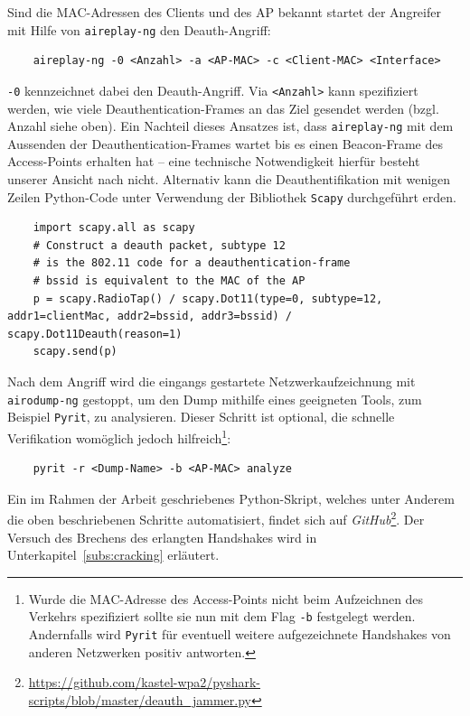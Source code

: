Sind die MAC-Adressen des Clients und des AP bekannt startet der Angreifer mit Hilfe von \texttt{aireplay-ng} den Deauth-Angriff: 
\begin{Verbatim}
	aireplay-ng -0 <Anzahl> -a <AP-MAC> -c <Client-MAC> <Interface>
\end{Verbatim}
\texttt{-0} kennzeichnet dabei den Deauth-Angriff.
Via \texttt{<Anzahl>} kann spezifiziert werden, wie viele Deauthentication-Frames an das Ziel gesendet werden (bzgl. Anzahl siehe oben).
Ein Nachteil dieses Ansatzes ist, dass \texttt{aireplay-ng} mit dem Aussenden der Deauthentication-Frames wartet bis es einen Beacon-Frame des Access-Points erhalten hat -- eine technische Notwendigkeit hierfür besteht unserer Ansicht nach nicht.
Alternativ kann die Deauthentifikation mit wenigen Zeilen Python-Code unter Verwendung der Bibliothek \texttt{Scapy} durchgeführt erden.

\begin{verbatim}
	import scapy.all as scapy
	# Construct a deauth packet, subtype 12 
	# is the 802.11 code for a deauthentication-frame
	# bssid is equivalent to the MAC of the AP
	p = scapy.RadioTap() / scapy.Dot11(type=0, subtype=12, addr1=clientMac, addr2=bssid, addr3=bssid) / scapy.Dot11Deauth(reason=1)
	scapy.send(p)
\end{verbatim}

Nach dem Angriff wird die eingangs gestartete Netzwerkaufzeichnung mit \texttt{airodump-ng} gestoppt, um den Dump mithilfe eines geeigneten Tools, zum Beispiel \texttt{Pyrit}, zu analysieren. Dieser Schritt ist optional, die schnelle Verifikation womöglich jedoch hilfreich\footnote{Wurde die MAC-Adresse des Access-Points nicht beim Aufzeichnen des Verkehrs spezifiziert sollte sie nun mit dem Flag \texttt{-b} festgelegt werden.
Andernfalls wird \texttt{Pyrit} für eventuell weitere aufgezeichnete Handshakes von anderen Netzwerken positiv antworten.}:
\begin{Verbatim}
	pyrit -r <Dump-Name> -b <AP-MAC> analyze
\end{Verbatim}
Ein im Rahmen der Arbeit geschriebenes Python-Skript, welches unter Anderem die oben beschriebenen Schritte automatisiert, findet sich auf \textit{GitHub}\footnote{\href{https://github.com/kastel-wpa2/pyshark-scripts/blob/master/deauth_jammer.py}{https://github.com/kastel-wpa2/pyshark-scripts/blob/master/deauth\_jammer.py}}.
Der Versuch des Brechens des erlangten Handshakes wird in Unterkapitel~\ref{subs:cracking} erläutert.

